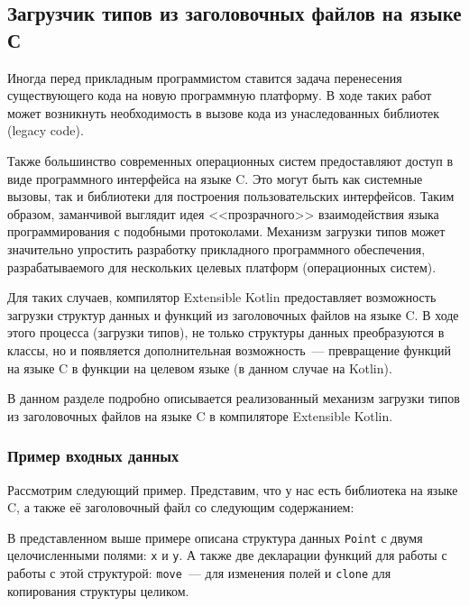 \subsection{Загрузчик типов из заголовочных файлов на языке С}\label{c-loader}
Иногда перед прикладным программистом ставится задача перенесения существующего кода на новую программную платформу.
В ходе таких работ может возникнуть необходимость в вызове кода из унаследованных библиотек (legacy code).

Также большинство современных операционных систем предоставляют доступ в виде программного интерфейса на языке C.
Это могут быть как системные вызовы, так и библиотеки для построения пользовательских интерфейсов.
Таким образом, заманчивой выглядит идея <<прозрачного>> взаимодействия языка программирования с подобными протоколами.
Механизм загрузки типов может значительно упростить разработку прикладного программного обеспечения, разрабатываемого для нескольких целевых платформ (операционных систем).

Для таких случаев, компилятор Extensible Kotlin предоставляет возможность загрузки структур данных и функций из заголовочных файлов на языке C.
В ходе этого процесса (загрузки типов), не только структуры данных преобразуются в классы, но и появляется дополнительная возможность~--- превращение функций на языке C в функции на целевом языке (в данном случае на Kotlin).

В данном разделе подробно описывается реализованный механизм загрузки типов из заголовочных файлов на языке C в компиляторе Extensible Kotlin.

\begin{code}
\subsubsection{Пример входных данных}
Рассмотрим следующий пример. Представим, что у нас есть библиотека на языке C, а также её заголовочный файл со следующим содержанием:

\end{code}

В представленном выше примере описана структура данных \texttt{Point} с двумя целочисленными полями: \texttt{x} и \texttt{y}.
А также две декларации функций для работы с работы с этой структурой: \texttt{move}~--- для изменения полей и \texttt{clone} для копирования структуры целиком.

